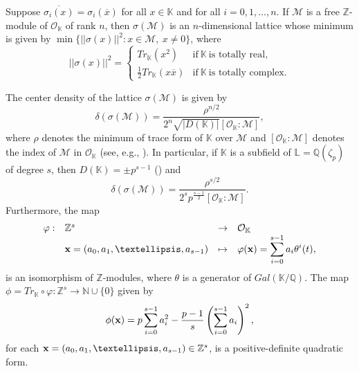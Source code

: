 \documentclass[10pt,a4paper]{amsart}
\begin{document}
Suppose $\overline{\sigma_i(x)}=\sigma_i(\overline{x})$ for all $x\in\mathbb{K}$ and for all $i=0,1,\ldots,n$. If $\mathcal{M}$ is a free $\mathbb{Z}$-module of $\mathcal{O}_{\mathbb{K}}$ of rank $n$, then $\sigma(\mathcal{M})$ is an $n$-dimensional lattice whose minimum is given by $\min\{||\sigma(x)||^2:x\in\mathcal{M},\ x\neq 0\}$, where \[ ||\sigma(x)||^2 = \left\{ \begin{array}{ll} Tr_{\mathbb{K}}(x^2) & \mbox{if} \ \mathbb{K} \ \mbox{is totally real,}\\  \frac{1}{2}Tr_{\mathbb{K}}(x\overline{x}) & \mbox{if} \ \mathbb{K} \ \mbox{is totally complex}. \end{array} \right. \] %

The center density of the lattice $\sigma(\mathcal{M})$ is given by \begin{equation} \label{densidade} \delta(\sigma(\mathcal{M})) = \frac{\rho^{n/2}}{2^n\sqrt{|D(\mathbb{K})|}[\mathcal{O}_{\mathbb{K}}:\mathcal{M}]}, \end{equation} where $\rho$ denotes the minimum of trace form of $\mathbb{K}$ over $\mathcal{M}$ and $[\mathcal{O}_{\mathbb{K}}:\mathcal{M}]$ denotes the index of $\mathcal{M}$ in $\mathcal{O}_{\mathbb{K}}$ (see, e.g., \cite{samuel}). 
In particular, if $\mathbb{K}$ is a subfield of $\mathbb{L}=\mathbb{Q}(\zeta_p)$ of degree $s$, then $D(\mathbb{K})=\pm p^{s-1}$ (\cite[Corollary 4.2]{trajano}) and 
\begin{equation}\label{eq_delta} \delta(\sigma(\mathcal{M})) = \frac{\rho^{s/2}}{2^sp^{\frac{s-1}{2}}[\mathcal{O}_{\mathbb{K}}:\mathcal{M}]}. \end{equation}
Furthermore, the map \[ \begin{array}{llll} \varphi:&\mathbb{Z}^s & \rightarrow & \mathcal{O}_{\mathbb{K}}\\ & {\bf x}=(a_0,a_1,\ldots,a_{s-1}) & \mapsto & \displaystyle \varphi({\bf x})=\sum_{i=0}^{s-1}a_i\theta^i(t), \end{array} \] is an isomorphism of $\mathbb{Z}$-modules, where $\theta$ is a generator of $Gal(\mathbb{K}/\mathbb{Q})$. The map $\phi=Tr_{\mathbb{K}}\circ\varphi:\mathbb{Z}^s\rightarrow \mathbb{N}\cup\{0\}$ given by \[ \phi({\bf x})=p\sum_{i=0}^{s-1}a_i^2-\frac{p-1}{s}\left(\sum_{i=0}^{s-1}a_i\right)^2, \] for each ${\bf x}=(a_0,a_1,\ldots,a_{s-1})\in\mathbb{Z}^s$, is a positive-definite quadratic form.
\end{document}
